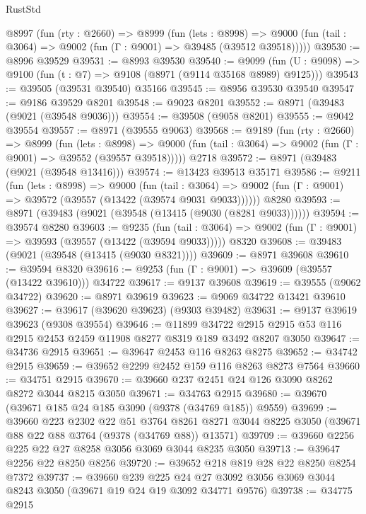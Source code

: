 \begin{lexlean}{RustStd}
\begin{coremodule}
  @8997
    (fun (rty : @2660) =>
    @8999
      (fun (lets : @8998) =>
      @9000 (fun (tail : @3064) => @9002 (fun (Γ : @9001) => @39485 (@39512 @39518)))))
@39530 := @8996 @39529
@39531 := @8993 @39530
@39540 := @9099
    (fun (U : @9098) => @9100 (fun (t : @7) => @9108 (@8971 (@9114 @35168 @8989) @9125)))
@39543 := @39505 (@39531 @39540) @35166
@39545 := @8956 @39530 @39540
@39547 := @9186 @39529 @8201
@39548 := @9023 @8201
@39552 := @8971 (@39483 (@9021 (@39548 @9036)))
@39554 := @39508 (@9058 @8201)
@39555 := @9042 @39554
@39557 := @8971 (@39555 @9063)
@39568 := @9189
    (fun (rty : @2660) =>
    @8999
      (fun (lets : @8998) =>
      @9000 (fun (tail : @3064) => @9002 (fun (Γ : @9001) => @39552 (@39557 @39518)))))
    @2718
@39572 := @8971 (@39483 (@9021 (@39548 @13416)))
@39574 := @13423 @39513 @35171
@39586 := @9211
    (fun (lets : @8998) =>
    @9000
      (fun (tail : @3064) =>
      @9002 (fun (Γ : @9001) => @39572 (@39557 (@13422 (@39574 @9031 @9033))))))
    @8280
@39593 := @8971 (@39483 (@9021 (@39548 (@13415 (@9030 (@8281 @9033))))))
@39594 := @39574 @8280
@39603 := @9235
    (fun (tail : @3064) => @9002 (fun (Γ : @9001) => @39593 (@39557 (@13422 (@39594 @9033)))))
    @8320
@39608 := @39483 (@9021 (@39548 (@13415 (@9030 @8321))))
@39609 := @8971 @39608
@39610 := @39594 @8320
@39616 := @9253 (fun (Γ : @9001) => @39609 (@39557 (@13422 @39610))) @34722
@39617 := @9137 @39608
@39619 := @39555 (@9062 @34722)
@39620 := @8971 @39619
@39623 := @9069 @34722 @13421 @39610
@39627 := @39617 (@39620 @39623) (@9303 @39482)
@39631 := @9137 @39619 @39623 (@9308 @39554)
@39646 := @11899
    @34722
    @2915
    @2915
    @53
    @116
    @2915
    @2453
    @2459
    @11908
    @8277
    @8319
    @189
    @3492
    @8207
    @3050
@39647 := @34736 @2915
@39651 := @39647 @2453 @116 @8263 @8275
@39652 := @34742 @2915
@39659 := @39652 @2299 @2452 @159 @116 @8263 @8273 @7564
@39660 := @34751 @2915
@39670 := @39660 @237 @2451 @24 @126 @3090 @8262 @8272 @3044 @8215 @3050
@39671 := @34763 @2915
@39680 := @39670 (@39671 @185 @24 @185 @3090 (@9378 (@34769 @185)) @9559)
@39699 := @39660
    @223
    @2302
    @22
    @51
    @3764
    @8261
    @8271
    @3044
    @8225
    @3050
    (@39671 @88 @22 @88 @3764 (@9378 (@34769 @88)) @13571)
@39709 := @39660 @2256 @225 @22 @27 @8258 @3056 @3069 @3044 @8235 @3050
@39713 := @39647 @2256 @22 @8250 @8256
@39720 := @39652 @218 @819 @28 @22 @8250 @8254 @7372
@39737 := @39660
    @239
    @225
    @24
    @27
    @3092
    @3056
    @3069
    @3044
    @8243
    @3050
    (@39671 @19 @24 @19 @3092 @34771 @9576)
@39738 := @34775 @2915

\end{coremodule}
\end{lexlean}
